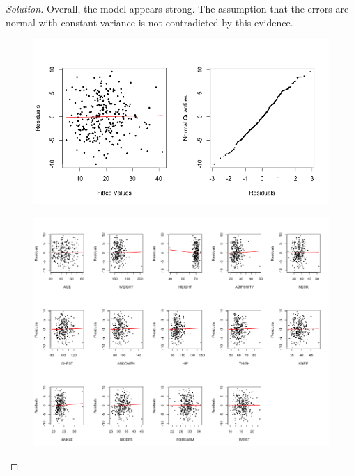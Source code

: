\documentclass[12pt]{article}
\begin{document}
\begin{enumerate}[leftmargin=0cm,itemindent=.5cm,labelwidth=\itemindent,labelsep=0cm,align=left]
\begin{proof}[Solution]
Overall, the model appears strong.  The assumption that the errors are normal with constant variance is not contradicted by this evidence.
\begin{figure}[ht!]
\centering
\includegraphics[width=160mm]{fitresnormqq.png}
\end{figure}

\begin{figure}[ht!]
\centering
\includegraphics[width=180mm]{manyplots.png}
\end{figure}


\end{proof}
\end{enumerate}
\end{document}

